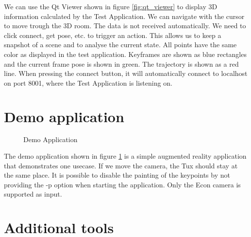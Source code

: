 \documentclass[11pt,a4paper,titlepage,oneside]{report}
\begin{document}
We can use the Qt Viewer shown in figure \ref{fig:qt_viewer} to display 3D information calculated by the Test Application. We can navigate with the cursor to move trough the 3D room. The data is not received automatically. We need to click connect, get pose, etc. to trigger an action. This allows us to keep a snapshot of a scene and to analyse the current state. All points have the same color as displayed in the test application. Keyframes are shown as blue rectangles and the current frame pose is shown in green. The trajectory is shown as a red line. When pressing the connect button, it will automatically connect to localhost on port 8001, where the Test Application is listening on.

\section{Demo application}
\begin{figure}[H]
  \centering
  \qquad
  \caption{Demo Application}\label{fig:demo_application}
\end{figure}

The demo application shown in figure \ref{fig:demo_application} is a simple augmented reality application that demonstrates one usecase. If we move the camera, the Tux should stay at the same place. It is possible to disable the painting of the keypoints by not providing the -p option when starting the application. Only the Econ camera is supported as input.

\section{Additional tools}
\end{document}

